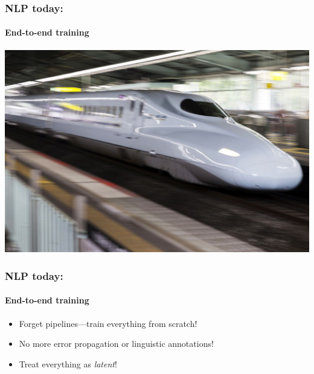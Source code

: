 \begin{frame}[plain]
\frametitle{NLP today:}
\framesubtitle{End-to-end training}
\begin{center}
\includegraphics[width=1.\columnwidth]{img/end_to_end_train.jpg}
\end{center}
\end{frame}


\begin{frame}
\frametitle{NLP today:}
\framesubtitle{End-to-end training}

\begin{itemize}
\item Forget pipelines---train everything from scratch!
\item No more error propagation or linguistic annotations! 
\item<2-> Treat everything as \emph{latent}! 
\end{itemize}
\end{frame}


